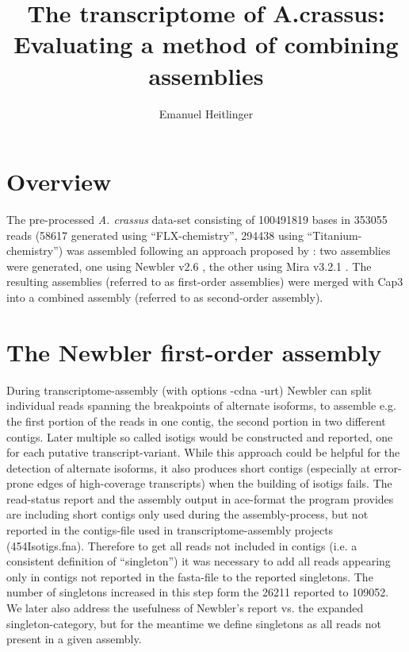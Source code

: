 \documentclass[12pt,a4paper]{article}
\date{}
\begin{document}
\title{The transcriptome of A.crassus: Evaluating a method of combining assemblies}
\author{Emanuel Heitlinger}

\maketitle



\section{Overview}
\label{sec:overview}

The pre-processed \textit{A. crassus} data-set consisting of
100491819 bases in 353055 reads (58617
generated using ``FLX-chemistry'', 294438 using
``Titanium-chemistry'') was assembled following an approach proposed
by \cite{pmid20950480}: two assemblies were generated, one using
Newbler v2.6 \cite{pmid16056220}, the other using Mira v3.2.1
\cite{miraEST}. The resulting assemblies (referred to as first-order
assemblies) were merged with Cap3 \cite{Cap3_Huang} into a combined
assembly (referred to as second-order assembly).


\section{The Newbler first-order assembly}
\label{sec:new-fist}




During transcriptome-assembly (with options -cdna -urt) Newbler can
split individual reads spanning the breakpoints of alternate isoforms,
to assemble e.g. the first portion of the reads in one contig, the
second portion in two different contigs. Later multiple so called
isotigs would be constructed and reported, one for each putative
transcript-variant. While this approach could be helpful for the
detection of alternate isoforms, it also produces short contigs
(especially at error-prone edges of high-coverage transcripts) when
the building of isotigs fails. The read-status report and the assembly
output in ace-format the program provides are including short contigs
only used during the assembly-process, but not reported in the
contigs-file used in transcriptome-assembly projects
(454Isotigs.fna). Therefore to get all reads not included in contigs
(i.e. a consistent definition of ``singleton'') it was necessary to
add all reads appearing only in contigs not reported in the fasta-file
to the reported singletons. The number of singletons increased in this
step form the 26211 reported to
109052. We later also address the usefulness of
Newbler's report vs. the expanded singleton-category, but for the
meantime we define singletons as all reads not present in a given
assembly.
\end{document}
